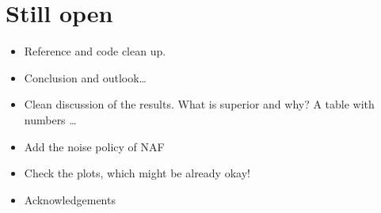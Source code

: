 \documentclass[
reprint,
amsmath,amssymb,amsfonts,clevref,
aps,
prstab,
]{revtex4-2}
\begin{document}
\section{Still open}
	\begin{itemize}
	\item Reference and code clean up.
	\item Conclusion and outlook\dots
	\item Clean discussion of the results. What is superior and why? A table with numbers \dots
	\item Add the noise policy of NAF
	\item Check the plots, which might be already okay!
	\item Acknowledgements
\end{itemize}
	
	
	
	

	\newpage{\pagestyle{empty}\cleardoublepage}
	
\end{document}
